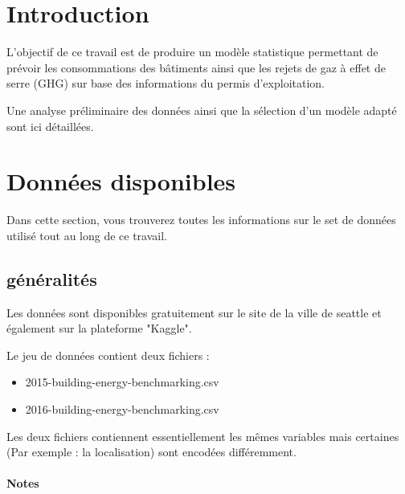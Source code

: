
\section{Introduction}

L'objectif de ce travail est de produire un modèle statistique permettant de prévoir
les consommations des bâtiments ainsi que les rejets de gaz à effet de serre (GHG) sur
base des informations du permis d'exploitation.

Une analyse préliminaire des données ainsi que la sélection d'un modèle
adapté sont ici détaillées.

\section{Données disponibles}

Dans cette section, vous trouverez toutes les informations sur le set de données
utilisé tout au long de ce travail.

\subsection{généralités}

Les données sont disponibles gratuitement sur le site de la ville de seattle et
également sur la plateforme "Kaggle".

Le jeu de données contient deux fichiers :
\begin{itemize}
  \item{2015-building-energy-benchmarking.csv}
  \item{2016-building-energy-benchmarking.csv}
\end{itemize}

Les deux fichiers contiennent essentiellement les mêmes variables mais
certaines (Par exemple : la localisation) sont encodées différemment.

\paragraph{Notes}

